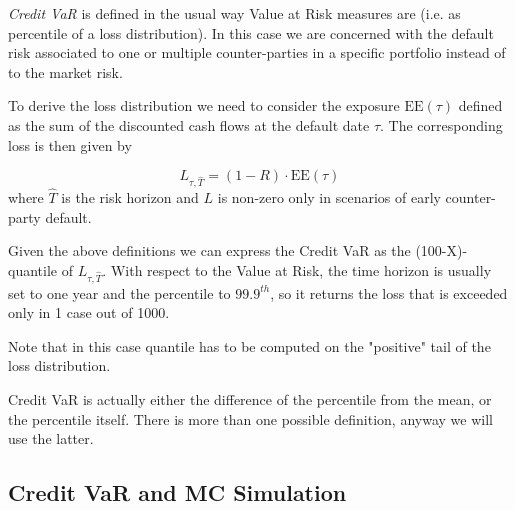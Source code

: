 \emph{Credit VaR} is defined in the usual way Value at Risk measures are (i.e. as percentile of a loss distribution).
In this case we are concerned with the default risk associated to one or multiple counter-parties in a specific portfolio instead of to the market risk.

To derive the loss distribution we need to consider the exposure $\textrm{EE}(\tau)$ defined as the sum of the discounted cash flows at the default date $\tau$. The corresponding loss is then given by

\begin{equation}
L_{\tau, \hat{T}} = (1 - R) \cdot \textrm{EE}(\tau)
\end{equation}
where \(\hat{T}\) is the risk horizon and $L$ is non-zero only in scenarios of early counter-party default. 

Given the above definitions we can express the Credit VaR as the (100-X)-quantile of $L_{\tau, \hat{T}}$.
With respect to the Value at Risk, the time horizon is usually set to one year and the percentile to $99.9^{th}$, so it returns the loss that is exceeded only in 1 case out of 1000. 

Note that in this case quantile has to be computed on the "positive" tail of the loss distribution.

Credit VaR is actually either the difference of the percentile from the mean, or the percentile itself. There is more than one possible definition, anyway we  will use the latter.

%

\subsection{Credit VaR and MC Simulation}

